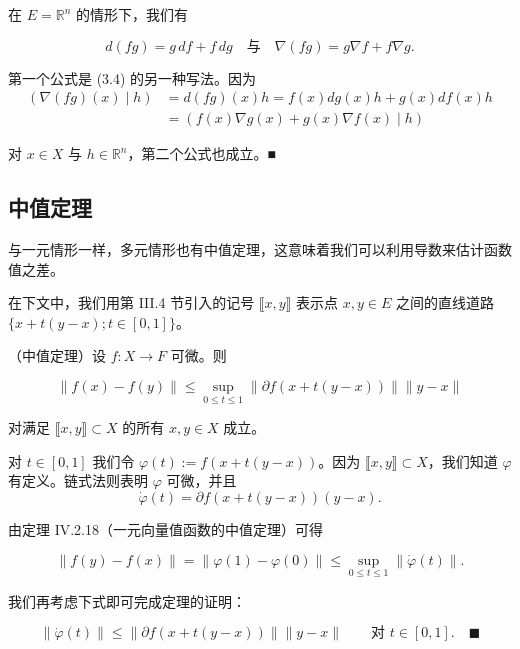 \begin{corollary}

在 $ E = \mathbb{R}^n $ 的情形下，我们有

\[
d(fg) = g\,df + f\,dg \quad \text{与} \quad \nabla(fg) = g\nabla f + f\nabla g .
\]

\proofhead
第一个公式是 (3.4) 的另一种写法。因为
\begin{equation*}
\begin{aligned}
(\nabla(fg)(x) \mid h) &= d(fg)(x)h = f(x)dg(x)h + g(x)df(x)h \\ &= (f(x)\nabla g(x) + g(x)\nabla f(x) \mid h)
\end{aligned}
\end{equation*}

对 $ x \in X $ 与 $ h \in \mathbb{R}^n $，第二个公式也成立。\nobreak\hspace{0.35em}■

\end{corollary}

\subsection*{中值定理}

与一元情形一样，多元情形也有中值定理，这意味着我们可以利用导数来估计函数值之差。

在下文中，我们用第 III.4 节引入的记号 $ \llbracket x, y \rrbracket $ 表示点 $ x, y \in E $ 之间的直线道路 $ \{x + t(y - x) ; t \in [0, 1]\} $。

\begin{theorem}

（中值定理）设 $ f : X \to F $ 可微。则

\begin{equation}
\|f(x) - f(y)\| \le \sup_{0 \le t \le 1}\|\partial f(x + t(y - x))\|\|y - x\|\tag{3.5}
\end{equation}

对满足 $ \llbracket x, y \rrbracket \subset X $ 的所有 $ x, y \in X $ 成立。

\proofhead
对 $ t \in [0, 1] $ 我们令 $ \varphi(t) := f(x + t(y - x)) $。因为 $ \llbracket x, y \rrbracket \subset X $，我们知道 $ \varphi $ 有定义。链式法则表明 $ \varphi $ 可微，并且
\[
\dot\varphi(t) = \partial f(x + t(y - x))(y - x) .
\]

由定理 IV.2.18（一元向量值函数的中值定理）可得

\[
\|f(y) - f(x)\| = \|\varphi(1) - \varphi(0)\| \le \sup_{0 \le t \le 1}\|\dot\varphi(t)\| .
\]

我们再考虑下式即可完成定理的证明：

\[
\|\dot\varphi(t)\| \le \|\partial f(x + t(y - x))\|\|y - x\| \qquad \text{对 } t \in [0, 1] .\quad\blacksquare
\]
\end{theorem}

